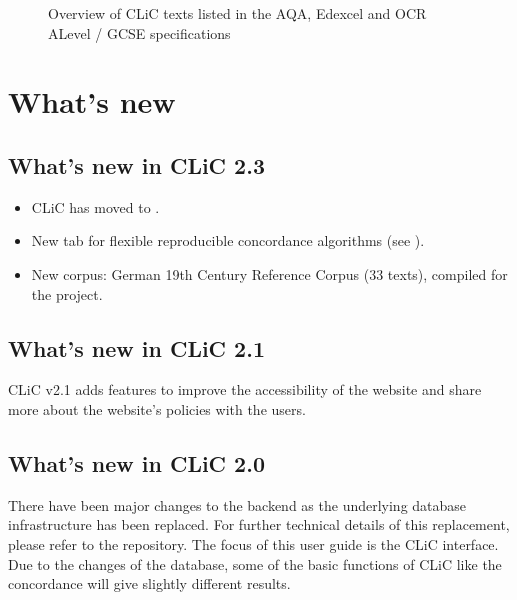 \documentclass[letterpaper,10pt,english]{sphinxmanual}
\begin{document}
\begin{figure}[htbp]
\centering
\capstart

\noindent{}
\caption{Overview of CLiC texts listed in the AQA, Edexcel and OCR
A\sphinxhyphen{}Level / GCSE specifications}\label{\detokenize{appendices:id7}}\end{figure}

\sphinxstepscope


\chapter{What’s new}
\label{\detokenize{whatsnew:what-s-new}}\label{\detokenize{whatsnew:whatsnew}}\label{\detokenize{whatsnew::doc}}

\section{What’s new in CLiC 2.3}
\label{\detokenize{whatsnew:what-s-new-in-clic-2-3}}\begin{itemize}
\item {} 
\sphinxAtStartPar
CLiC has moved to .

\item {} 
\sphinxAtStartPar
New  tab for flexible reproducible concordance algorithms
(see {\hyperref[\detokenize{clicanalysis/flexiconc:flexiconc}]{}}).

\item {} 
\sphinxAtStartPar
New  corpus: German 19th Century Reference Corpus (33 texts),
compiled for the  project.

\end{itemize}


\section{What’s new in CLiC 2.1}
\label{\detokenize{whatsnew:what-s-new-in-clic-2-1}}
\sphinxAtStartPar
CLiC v2.1 adds features to improve the accessibility of the website and
share more about the website’s policies with the users.


\section{What’s new in CLiC 2.0}
\label{\detokenize{whatsnew:what-s-new-in-clic-2-0}}
\sphinxAtStartPar
There have been major changes to the back\sphinxhyphen{}end as the underlying database
infrastructure has been replaced. For further technical details of this
replacement, please refer to the  repository. The focus of
this user guide is the CLiC interface. Due to the changes of the
database, some of the basic functions of CLiC \textendash{} like the concordance \textendash{}
will give slightly different results.
\end{document}
